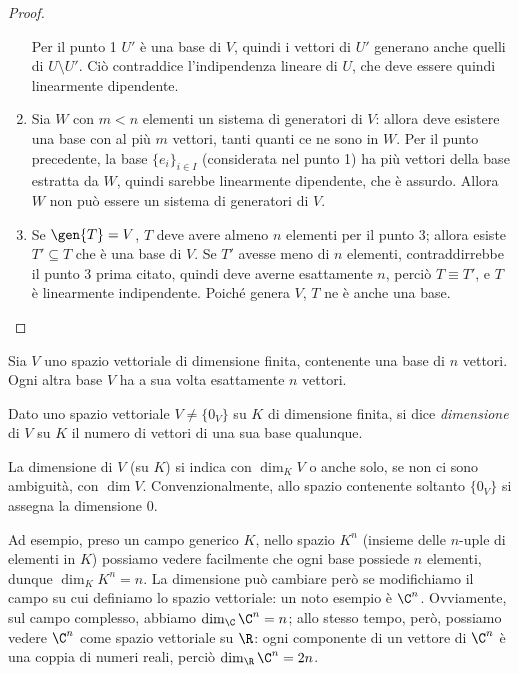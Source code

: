 \begin{proof}
\begin{enumerate}
			Per il punto 1 $U'$ è una base di $V$, quindi i vettori di $U'$ generano anche quelli di $U\setminus U'$.
			Ciò contraddice l'indipendenza lineare di $U$, che deve essere quindi linearmente dipendente.
		\item Sia $W$ con $m<n$ elementi un sistema di generatori di $V$: allora deve esistere una base con al più $m$ vettori, tanti quanti ce ne sono in $W$.
			Per il punto precedente, la base $\{  e_i\}_{i\in I}$ (considerata nel punto 1) ha più vettori della base estratta da $W$, quindi sarebbe linearmente dipendente, che è assurdo.
			Allora $W$ non può essere un sistema di generatori di $V$.
		\item Se $\gen{T}=V$, $T$ deve avere almeno $n$ elementi per il punto 3; allora esiste $T'\subseteq T$ che è una base di $V$.
			Se $T'$ avesse meno di $n$ elementi, contraddirrebbe il punto 3 prima citato, quindi deve averne esattamente $n$, perciò $T\equiv T'$, e $T$ è linearmente indipendente.
			Poiché genera $V$, $T$ ne è anche una base.
	\end{enumerate}
\end{proof}
\begin{corollario}
	Sia $V$ uno spazio vettoriale di dimensione finita, contenente una base di $n$ vettori.
	Ogni altra base $V$ ha a sua volta esattamente $n$ vettori.
\end{corollario}

\begin{definizione} \label{d:dimensione}
	Dato uno spazio vettoriale $V\neq\{0_V\}$ su $K$ di dimensione finita, si dice \emph{dimensione} di $V$ su $K$ il numero di vettori di una sua base qualunque.
\end{definizione}
La dimensione di $V$ (su $K$) si indica con $\dim_KV$ o anche solo, se non ci sono ambiguità, con $\dim V$.
Convenzionalmente, allo spazio contenente soltanto $\{0_V\}$ si assegna la dimensione 0.

Ad esempio, preso un campo generico $K$, nello spazio $K^n$ (insieme delle $n$-uple di elementi in $K$) possiamo vedere facilmente che ogni base possiede $n$ elementi, dunque $\dim_KK^n=n$.
La dimensione può cambiare però se modifichiamo il campo su cui definiamo lo spazio vettoriale: un noto esempio è $\C^n$.
Ovviamente, sul campo complesso, abbiamo $\dim_\C\C^n=n$; allo stesso tempo, però, possiamo vedere $\C^n$ come spazio vettoriale su $\R$: ogni componente di un vettore di $\C^n$ è una coppia di numeri reali, perciò $\dim_\R\C^n=2n$.

